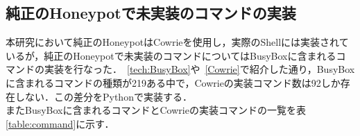\subsection{純正のHoneypotで未実装のコマンドの実装}
\label{impl:ImplBusyBox}
本研究において純正のHoneypotはCowrie\cite{cowrie}を使用し，実際のShellには実装されているが，純正のHoneypotで未実装のコマンドについてはBusyBox\cite{busybox}に含まれるコマンドの実装を行なった．~\ref{tech:BusyBox}や~\ref{Cowrie}で紹介した通り，BusyBoxに含まれるコマンドの種類が219ある中で，Cowrieの実装コマンド数は92しか存在しない．この差分をPythonで実装する．\\
またBusyBoxに含まれるコマンドとCowrieの実装コマンドの一覧を表\ref{table:command}に示す．\\
\vspace{3mm}
\setlength{\myheight}{10mm}
